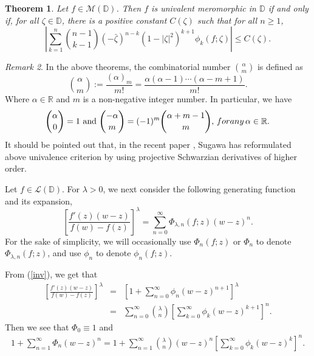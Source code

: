 \documentclass[10pt]{amsart}
\newtheorem{theorem}{Theorem}[section]
\theoremstyle{definition}
\theoremstyle{remark}
\newtheorem{remark}[theorem]{Remark}
\numberwithin{equation}{section}
\begin{document}
\begin{theorem}\label{ah-3}
Let $f\in \mathcal{M}(\mathbb{D})$. Then $f$ is univalent meromorphic in $\mathbb{D}$ if and only if, for all $\zeta\in \mathbb{D}$, there is a positive constant $C(\zeta)$ such that for all $n\geq 1$,
\begin{equation}\left|\sum_{k=1}^n \binom{n-1}{k-1} (-\bar{\zeta})^{n-k}(1-|\zeta|^2)^{k+1}\phi_k(f; \zeta)\right|\leq C(\zeta).\nonumber
\end{equation}
\end{theorem}

\begin{remark}In the above theorems, the combinatorial number $\binom{\alpha}{m}$ is defined as 
$$\binom{\alpha}{m}:=\frac{(\alpha)_m}{m!}=\frac{\alpha(\alpha-1)\cdots (\alpha-m+1)}{m!}.$$
Where $\alpha\in \mathbb{R}$ and $m$ is a non-negative integer number. In particular, we have
 $$\binom{\alpha}{0}=1\,\,  {\text{and}}\,\, \binom{-\alpha}{m}=(-1)^m\binom{\alpha+m-1}{m},\, {\textup {for any}}\, \alpha\in \mathbb{R}.$$
It should be pointed out that, in the recent paper \cite{Su}, Sugawa has reformulated above univalence criterion by using projective Schwarzian derivatives of higher order. 
 \end{remark}

Let $f\in \mathcal{L}(\mathbb{D})$. For $\lambda>0$,  we next consider the following generating function and its expansion,
\begin{equation}\label{new}
\left[\frac{f'(z)(w-z)}{f(w)-f(z)}\right]^{\lambda}=\sum_{n=0}^{\infty}\Phi_{\lambda, n}(f; z)(w-z)^n.
\end{equation}
 For the sake of simplicity, we will occasionally use  $\Phi_n(f; z)$ or $\Phi_n$ to denote $\Phi_{\lambda, n}(f; z)$, and use $\phi_n$ to denote $\phi_{n}(f; z)$.   
 
From (\ref{inv}), we get that 
 \begin{eqnarray}
\left[\frac{f'(z)(w-z)}{f(w)-f(z)}\right]^{\lambda}&=&\left[1+\sum_{n=0}^{\infty}\phi_n(w-z)^{n+1}\right]^{\lambda} \nonumber \\
&=&\sum_{n=0}^{\infty}\binom{\lambda}{n} \left[\sum_{k=0}^{\infty}\phi_k(w-z)^{k+1}\right]^{n}.\nonumber 
\end{eqnarray} 
Then we see that $\Phi_0\equiv 1$ and 
\begin{eqnarray}
1+\sum_{n=1}^{\infty}\Phi_{n}(w-z)^n=1+\sum_{n=1}^{\infty}\binom{\lambda}{n}(w-z)^n \left[\sum_{k=0}^{\infty}\phi_k(w-z)^{k}\right]^{n}.\nonumber \end{eqnarray}
\end{document}
